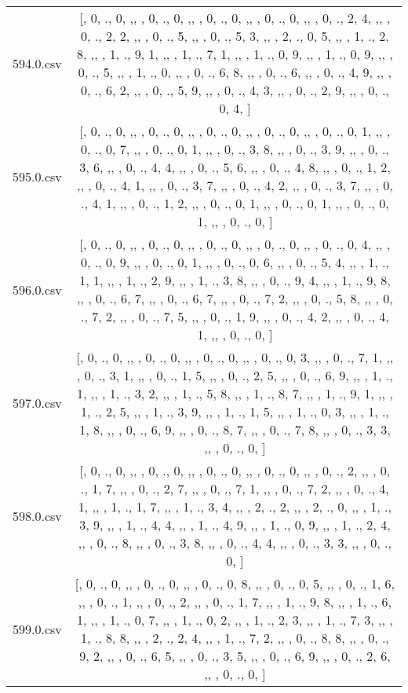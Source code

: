\begin{table}[ht]
\begin{tabular}{@{}c c@{}}
	594.0.csv & [, 0, ., 0, ,,  , 0, ., 0, ,,  , 0, ., 0, ,,  , 0, ., 0, ,,  , 0, ., 2, 4, ,,  , 0, ., 2, 2, ,,  , 0, ., 5, ,,  , 0, ., 5, 3, ,,  , 2, ., 0, 5, ,,  , 1, ., 2, 8, ,,  , 1, ., 9, 1, ,,  , 1, ., 7, 1, ,,  , 1, ., 0, 9, ,,  , 1, ., 0, 9, ,,  , 0, ., 5, ,,  , 1, ., 0, ,,  , 0, ., 6, 8, ,,  , 0, ., 6, ,,  , 0, ., 4, 9, ,,  , 0, ., 6, 2, ,,  , 0, ., 5, 9, ,,  , 0, ., 4, 3, ,,  , 0, ., 2, 9, ,,  , 0, ., 0, 4, ]\\ 
	595.0.csv & [, 0, ., 0, ,,  , 0, ., 0, ,,  , 0, ., 0, ,,  , 0, ., 0, ,,  , 0, ., 0, 1, ,,  , 0, ., 0, 7, ,,  , 0, ., 0, 1, ,,  , 0, ., 3, 8, ,,  , 0, ., 3, 9, ,,  , 0, ., 3, 6, ,,  , 0, ., 4, 4, ,,  , 0, ., 5, 6, ,,  , 0, ., 4, 8, ,,  , 0, ., 1, 2, ,,  , 0, ., 4, 1, ,,  , 0, ., 3, 7, ,,  , 0, ., 4, 2, ,,  , 0, ., 3, 7, ,,  , 0, ., 4, 1, ,,  , 0, ., 1, 2, ,,  , 0, ., 0, 1, ,,  , 0, ., 0, 1, ,,  , 0, ., 0, 1, ,,  , 0, ., 0, ]\\ 
	596.0.csv & [, 0, ., 0, ,,  , 0, ., 0, ,,  , 0, ., 0, ,,  , 0, ., 0, ,,  , 0, ., 0, 4, ,,  , 0, ., 0, 9, ,,  , 0, ., 0, 1, ,,  , 0, ., 0, 6, ,,  , 0, ., 5, 4, ,,  , 1, ., 1, 1, ,,  , 1, ., 2, 9, ,,  , 1, ., 3, 8, ,,  , 0, ., 9, 4, ,,  , 1, ., 9, 8, ,,  , 0, ., 6, 7, ,,  , 0, ., 6, 7, ,,  , 0, ., 7, 2, ,,  , 0, ., 5, 8, ,,  , 0, ., 7, 2, ,,  , 0, ., 7, 5, ,,  , 0, ., 1, 9, ,,  , 0, ., 4, 2, ,,  , 0, ., 4, 1, ,,  , 0, ., 0, ]\\ 
	597.0.csv & [, 0, ., 0, ,,  , 0, ., 0, ,,  , 0, ., 0, ,,  , 0, ., 0, 3, ,,  , 0, ., 7, 1, ,,  , 0, ., 3, 1, ,,  , 0, ., 1, 5, ,,  , 0, ., 2, 5, ,,  , 0, ., 6, 9, ,,  , 1, ., 1, ,,  , 1, ., 3, 2, ,,  , 1, ., 5, 8, ,,  , 1, ., 8, 7, ,,  , 1, ., 9, 1, ,,  , 1, ., 2, 5, ,,  , 1, ., 3, 9, ,,  , 1, ., 1, 5, ,,  , 1, ., 0, 3, ,,  , 1, ., 1, 8, ,,  , 0, ., 6, 9, ,,  , 0, ., 8, 7, ,,  , 0, ., 7, 8, ,,  , 0, ., 3, 3, ,,  , 0, ., 0, ]\\ 
	598.0.csv & [, 0, ., 0, ,,  , 0, ., 0, ,,  , 0, ., 0, ,,  , 0, ., 0, ,,  , 0, ., 2, ,,  , 0, ., 1, 7, ,,  , 0, ., 2, 7, ,,  , 0, ., 7, 1, ,,  , 0, ., 7, 2, ,,  , 0, ., 4, 1, ,,  , 1, ., 1, 7, ,,  , 1, ., 3, 4, ,,  , 2, ., 2, ,,  , 2, ., 0, ,,  , 1, ., 3, 9, ,,  , 1, ., 4, 4, ,,  , 1, ., 4, 9, ,,  , 1, ., 0, 9, ,,  , 1, ., 2, 4, ,,  , 0, ., 8, ,,  , 0, ., 3, 8, ,,  , 0, ., 4, 4, ,,  , 0, ., 3, 3, ,,  , 0, ., 0, ]\\ 
	599.0.csv & [, 0, ., 0, ,,  , 0, ., 0, ,,  , 0, ., 0, 8, ,,  , 0, ., 0, 5, ,,  , 0, ., 1, 6, ,,  , 0, ., 1, ,,  , 0, ., 2, ,,  , 0, ., 1, 7, ,,  , 1, ., 9, 8, ,,  , 1, ., 6, 1, ,,  , 1, ., 0, 7, ,,  , 1, ., 0, 2, ,,  , 1, ., 2, 3, ,,  , 1, ., 7, 3, ,,  , 1, ., 8, 8, ,,  , 2, ., 2, 4, ,,  , 1, ., 7, 2, ,,  , 0, ., 8, 8, ,,  , 0, ., 9, 2, ,,  , 0, ., 6, 5, ,,  , 0, ., 3, 5, ,,  , 0, ., 6, 9, ,,  , 0, ., 2, 6, ,,  , 0, ., 0, ]\\ 

\end{tabular}
\end{table}
